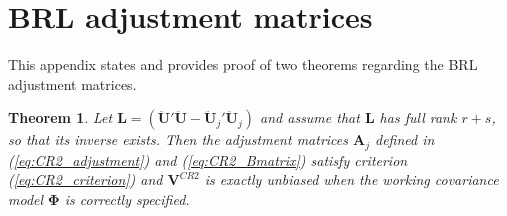 \documentclass[12pt]{article}\usepackage[]{graphicx}\usepackage[]{color}
\newtheorem{thm}{Theorem}
\newcommand{\bm}{\mathbf}
\newcommand{\bs}{\boldsymbol}
\begin{document}

\appendix

\section{BRL adjustment matrices}
\label{app:theorems}

This appendix states and provides proof of two theorems regarding the BRL adjustment matrices. 

\begin{thm}
\label{thm:BRL_FE}
Let $\bm{L} = \left(\bm{\ddot{U}}'\bm{\ddot{U}} - \bm{\ddot{U}}_j'\bm{\ddot{U}}_j\right)$ and assume that $\bm{L}$ has full rank $r + s$, so that its inverse exists. Then the adjustment matrices $\bm{A}_j$ defined in (\ref{eq:CR2_adjustment}) and (\ref{eq:CR2_Bmatrix}) satisfy criterion (\ref{eq:CR2_criterion}) and $\bm{V}^{CR2}$ is exactly unbiased when the working covariance model $\bs\Phi$ is correctly specified.
\end{thm}
\end{document}
